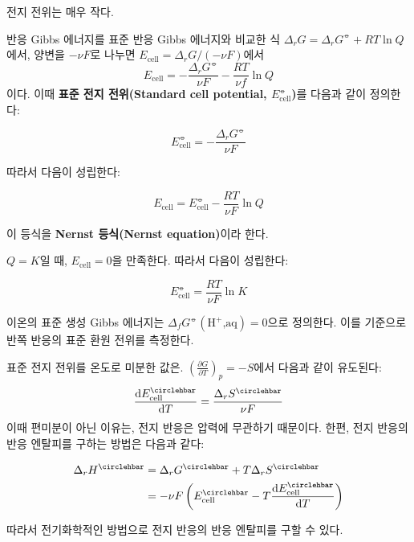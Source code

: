         전지 전위는 매우 작다.
        \par 반응 Gibbs 에너지를 표준 반응 Gibbs 에너지와 비교한 식 $\Delta_r G = \Delta_r G^\circlehbar + RT\ln{Q}$에서, 양변을 $-\nu F$로 나누면 $E_\mathrm{cell} = \Delta_r G / \left(-\nu F\right)$에서
        \begin{equation*}
            E_\mathrm{cell}=-\frac{\Delta_r G^\circlehbar}{\nu F}-\frac{RT}{\nu f}\ln{Q}
        \end{equation*}
        이다. 이때 \textbf{표준 전지 전위(Standard cell potential, $E_\mathrm{cell}^\circlehbar$)}를 
        다음과 같이 정의한다:
        \begin{defn}[표준 전지 전위]
        \begin{equation*}
            E_\mathrm{cell}^\circlehbar = -\frac{\Delta_r G^\circlehbar}{\nu F}
        \end{equation*}
        \end{defn}
        따라서 다음이 성립한다:
        \begin{law}[Nernst 등식]
        \begin{equation*}
            E_\mathrm{cell} = E_\mathrm{cell}^\circlehbar - \frac{RT}{\nu F}\ln{Q}
        \end{equation*}
        \end{law}
        이 등식을 \textbf{Nernst 등식(Nernst equation)}이라 한다.
        \par $Q=K$일 때, $E_\mathrm{cell}=0$을 만족한다. 따라서 다음이 성립한다:
        \begin{law}
        \begin{equation*}
            E_\mathrm{cell}^\circlehbar = \frac{RT}{\nu F}\ln{K}
        \end{equation*}
        \end{law}
        이온의 표준 생성 Gibbs 에너지는 $\Delta_f G^\circlehbar\left(\text{H}^+\text{,aq}\right)=0$으로 정의한다. 이를 기준으로 반쪽 반응의 표준 환원 전위를 측정한다.
        \par 표준 전지 전위를 온도로 미분한 값은. $\displaystyle\left(\frac{\partial G}{\partial T}\right)_p = -S$에서 다음과 같이 유도된다:
        \begin{equation*}
            \frac{\difform E_\mathrm{cell}^\circlehbar}{\difform T}=\frac{\Delta_r S^\circlehbar}{\nu F}
        \end{equation*}
        이때 편미분이 아닌 이유는, 전지 반응은 압력에 무관하기 때문이다. 한편, 전지 반응의 반응 엔탈피를 구하는 방법은 다음과 같다:
        \begin{obs}
        \begin{equation*}
            \begin{aligned}
                \Delta_r H^\circlehbar &=\Delta_r G^\circlehbar + T \Delta_r S^\circlehbar\\
                &= -\nu F\left(E_\mathrm{cell}^\circlehbar-T\frac{\difform E_\mathrm{cell}^\circlehbar}{\difform T}\right)
            \end{aligned}
        \end{equation*}
        \end{obs}
        따라서 전기화학적인 방법으로 전지 반응의 반응 엔탈피를 구할 수 있다.
